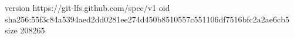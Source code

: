 version https://git-lfs.github.com/spec/v1
oid sha256:55f3c84a5394aed2dd0281ee274d450b8510557c551106df7516bfc2a2ae6cb5
size 208265
